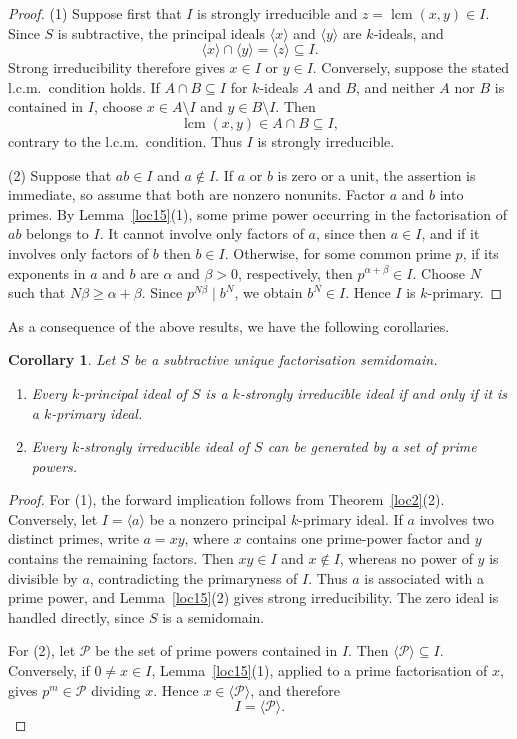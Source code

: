 \documentclass[11pt,leqno]{amsart}
\newtheorem{corollary}[theorem]{Corollary}
\theoremstyle{definition}
\numberwithin{equation}{section}
\begin{document}
\begin{proof}

(1) Suppose first that $I$ is strongly irreducible and
$z=\operatorname{lcm}(x,y)\in I$. Since $S$ is subtractive, the principal
ideals $\langle x\rangle$ and $\langle y\rangle$ are $k$-ideals, and
\[
\langle x\rangle\cap\langle y\rangle=\langle z\rangle\subseteq I.
\]
Strong irreducibility therefore gives $x\in I$ or $y\in I$. Conversely,
suppose the stated l.c.m.\ condition holds. If $A\cap B\subseteq I$ for
$k$-ideals $A$ and $B$, and neither $A$ nor $B$ is contained in $I$, choose
$x\in A\setminus I$ and $y\in B\setminus I$. Then
\[
\operatorname{lcm}(x,y)\in A\cap B\subseteq I,
\]
contrary to the l.c.m.\ condition. Thus $I$ is strongly irreducible.

(2) Suppose that $ab\in I$ and $a\notin I$. If $a$ or $b$ is zero or a unit, the assertion is immediate, so assume that both are nonzero nonunits. Factor $a$ and $b$ into primes. By Lemma~\ref{loc15}(1), some prime power occurring in the factorisation of $ab$ belongs to $I$. It cannot involve only factors of $a$, since then $a\in I$, and if it involves only factors of $b$ then $b\in I$. Otherwise, for some common prime $p$, if its exponents in $a$ and $b$ are $\alpha$ and $\beta>0$, respectively, then $p^{\alpha+\beta}\in I$. Choose $N$ such that $N\beta\geq\alpha+\beta$. Since $p^{N\beta}\mid b^N$, we obtain $b^N\in I$. Hence $I$ is $k$-primary.
\end{proof}


As a consequence of the above results, we have the following corollaries.

\begin{corollary}
Let $S$ be a subtractive unique factorisation semidomain.
\begin{enumerate}

\item Every $k$-principal ideal of $S$ is a $k$-strongly irreducible ideal if and only if it is a
$k$-primary ideal.
	
\item Every $k$-strongly irreducible ideal of $S$ can be generated by a set of prime powers.
\end{enumerate}
\end{corollary}
\begin{proof}
For (1), the forward implication follows from Theorem~\ref{loc2}(2).
Conversely, let $I=\langle a\rangle$ be a nonzero principal $k$-primary ideal. If $a$ involves two distinct primes, write $a=xy$, where $x$ contains one prime-power factor and $y$ contains the remaining factors. Then $xy\in I$ and $x\notin I$, whereas no power of $y$ is divisible by $a$,
contradicting the primaryness of $I$. Thus $a$ is associated with a prime power, and Lemma~\ref{loc15}(2) gives strong irreducibility. The zero ideal is handled directly, since $S$ is a semidomain.

For (2), let $\mathcal P$ be the set of prime powers contained in $I$. Then
$\langle\mathcal P\rangle\subseteq I$. Conversely, if $0\ne x\in I$, Lemma~\ref{loc15}(1), applied to a prime factorisation of $x$, gives $p^m\in\mathcal P$ dividing $x$. Hence $x\in\langle\mathcal P\rangle$, and therefore
\[
I=\langle\mathcal P\rangle.
\]
\end{proof}
\end{document}
